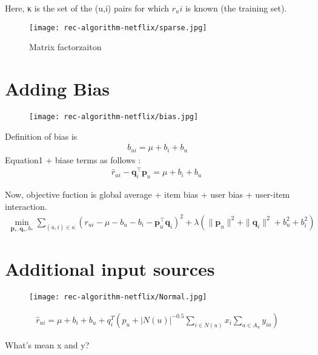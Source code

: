 \documentclass{article}
\begin{document}
Here, κ is the set of the (u,i) pairs for which $r_ui$ is known 
(the training set).


\begin{figure}[H]
    \centering
    \texttt{[image: rec-algorithm-netflix/sparse.jpg]}
    \caption{Matrix factorzaiton}
\end{figure}

\section{Adding Bias}

\begin{figure}[H]
    \centering
    \texttt{[image: rec-algorithm-netflix/bias.jpg]}

\end{figure}

\newpage
Definition of bias is
\begin{align}
    b_{ui} = \mu + b_i + b_u
\end{align}
Equation1 + biase terms as follows :
\begin{align}
    \hat{r}_{ui} - \mathbf{q}_i^\top \mathbf{p}_u  = \mu + b_i + b_u\
\end{align}


Now, objective fuction is global average + item bias + user bias + user-item interaction.
\begin{align}
\min_{\mathbf{p}_*, \mathbf{q}_*, b_*} \sum_{(u, i) \in \kappa} \left( r_{ui} - \mu - b_u - b_i - \mathbf{p}_u^\top \mathbf{q}_i \right)^2 + \lambda \left( \|\mathbf{p}_u\|^2 + \|\mathbf{q}_i\|^2 + b_u^2 + b_i^2 \right)
\end{align}

\section{Additional input sources}
\begin{figure}[H]
    \centering
    \texttt{[image: rec-algorithm-netflix/Normal.jpg]}

\end{figure}

\begin{align}
\hat{r}_{ui} = \mu + b_i + b_u + q_i^T \left( p_u + \left|N(u)\right|^{-0.5} \sum_{i \in N(u)} x_i \sum_{a \in A_u} y_{ia} \right)
\end{align}

What's mean x and y? \\
\end{document}
